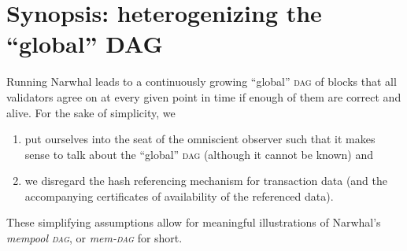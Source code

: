 \documentclass[%
dvipsnames
]{article}
\theoremstyle{definition}
\newcommand{\Dag}[1][]{\textsc{dag}#1\xspace}
\newcommand{\etc}[1][ ]{\emph{etc.}\xspace}
\renewcommand{\todo}[2][]{}
\begin{document}



\todo[inline,size=normalsize,caption={}]{%
  recall/discuss the properties 
  such as chain quality, 
  fair inclusion,
  \etc
}

\section{Synopsis: %
  heterogenizing the “global” DAG
}
\label{sec:overview}
Running  Narwhal \cite{NT} leads to a continuously growing “global” \Dag of blocks that %
all validators agree on at every given point in time %
if enough of them are correct and alive.
For the sake of simplicity,
we
\begin{enumerate}
\item
  put ourselves into the seat of the omniscient observer
  such that it makes sense to talk about the “global” \Dag %
  (although it cannot be known) %
  and
\item
  we disregard the hash referencing mechanism for transaction data
  (and the accompanying certificates of availability of the referenced data).
\end{enumerate}
These simplifying assumptions allow for meaningful illustrations 
of Narwhal's \emph{mempool \Dag}, or \emph{mem-\Dag} for short. 
\end{document}
